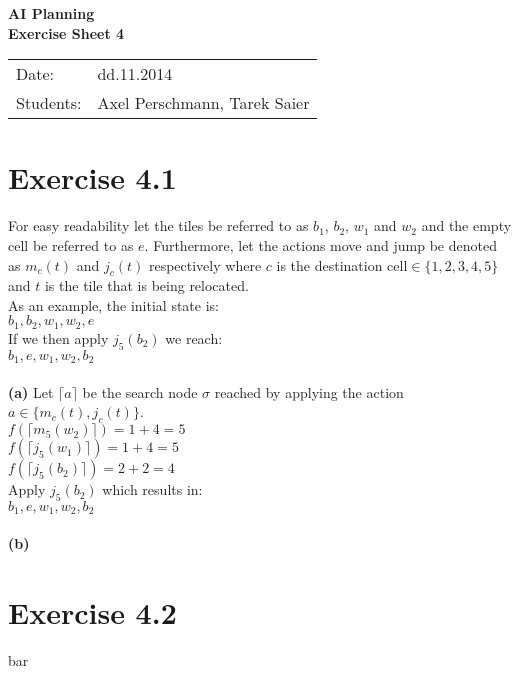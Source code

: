 \documentclass[11pt,a4paper]{article}
\begin{document}
\begin{center}
\Huge{\textbf{AI Planning}}\\
\LARGE{\textbf{Exercise Sheet 4}}
\end{center}
\vspace{2cm}
\begin{tabular}{ll}
Date: & dd.11.2014\\
Students: & Axel Perschmann, Tarek Saier
\end{tabular}

\section*{Exercise 4.1}
For easy readability let the tiles be referred to as $b_1$, $b_2$, $w_1$ and $w_2$ and the empty cell be referred to as $e$. Furthermore, let the actions move and jump be denoted as $m_c(t)$ and $j_c(t)$ respectively where $c$ is the destination cell$\in \{1,2,3,4,5\}$ and $t$ is the tile that is being relocated.\\
As an example, the initial state is:\\
$b_1,b_2,w_1,w_2,e$\\
If we then apply $j_5(b_2)$ we reach:\\
$b_1,e,w_1,w_2,b_2$\\
\\
\textbf{(a)} Let $\lceil a\rceil$ be the search node $\sigma$ reached by applying the action $a\in \{m_c(t),j_c(t)\}$.\\
$f(\lceil m_5(w_2)\rceil)=1+4=5$\\
$f(\lceil j_5(w_1)\rceil)=1+4=5$\\
$f(\lceil j_5(b_2)\rceil)=2+2=4$\\
Apply $j_5(b_2)$ which results in:\\
$b_1,e,w_1,w_2,b_2$\\
\\
\textbf{(b)}

\section*{Exercise 4.2}
bar
\end{document}
